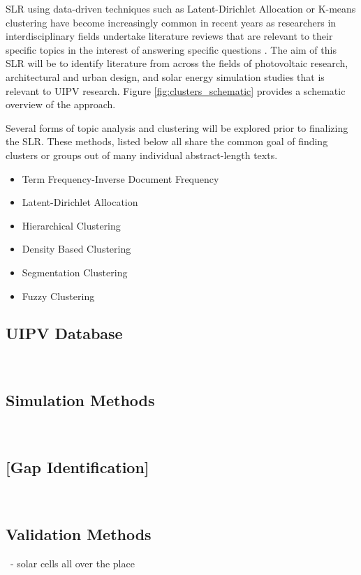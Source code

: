 SLR using data-driven techniques such as Latent-Dirichlet Allocation or K-means clustering have become increasingly common in recent years as researchers in interdisciplinary fields undertake literature reviews that are relevant to their specific topics in the interest of answering specific questions \cite{aromataris_systematic_2014, munn_systematic_2018, kim_research_2019}. The aim of this SLR will be to identify literature from across the fields of photovoltaic research, architectural and urban design, and solar energy simulation studies that is relevant to UIPV research. Figure \ref{fig:clusters_schematic} provides a schematic overview of the approach.

Several forms of topic analysis and clustering will be explored prior to finalizing the SLR. These methods, listed below all share the common goal of finding clusters or groups out of many individual abstract-length texts. 

\begin{itemize}
    \item Term Frequency-Inverse Document Frequency
    \item Latent-Dirichlet Allocation
    \item Hierarchical Clustering
    \item Density Based Clustering
    \item Segmentation Clustering
    \item Fuzzy Clustering
\end{itemize}


\subsection{UIPV Database}\




\subsection{Simulation Methods}\




\subsection{[Gap Identification]}\




\subsection{Validation Methods}\
- solar cells all over the place



